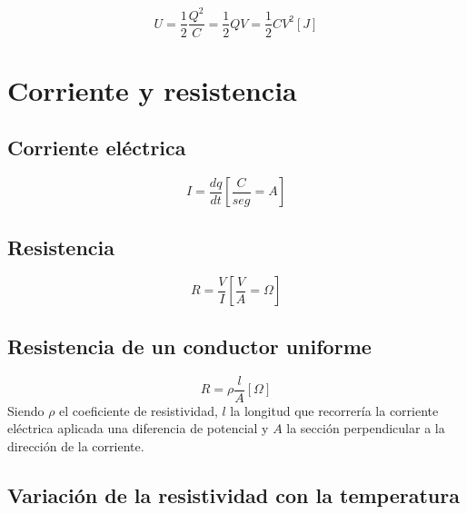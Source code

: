 \documentclass{report}
\begin{document}
      \begin{equation*}
        U=\frac{1}{2}\frac{Q^2}{C}=\frac{1}{2}QV=\frac{1}{2}CV^2[J]
      \end{equation*}

  \section*{Corriente y resistencia}

    \subsection*{Corriente eléctrica}

      \begin{equation*}
        I=\frac{dq}{dt}\left[\frac{C}{seg}=A\right]
      \end{equation*}

    \subsection*{Resistencia}

      \begin{equation*}
        R=\frac{V}{I}\left[\frac{V}{A}=\Omega\right]
      \end{equation*}

    \subsection*{Resistencia de un conductor uniforme}

      \begin{equation*}
        R=\rho\frac{l}{A}[\Omega]
      \end{equation*}
      \indent Siendo $\rho$ el coeficiente de resistividad, $l$ la longitud que recorrería
      la corriente eléctrica aplicada una diferencia de potencial y $A$ la sección
      perpendicular a la dirección de la corriente.

    \subsection*{Variación de la resistividad con la temperatura}
      
\end{document}

